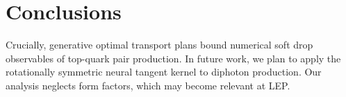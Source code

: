 \section{Conclusions}\label{sec:conclusions}

Crucially, generative optimal transport plans bound numerical soft drop
observables of top-quark pair production. In future work, we plan to
apply the rotationally symmetric neural tangent kernel to diphoton
production. Our analysis neglects form factors, which may become
relevant at LEP.

